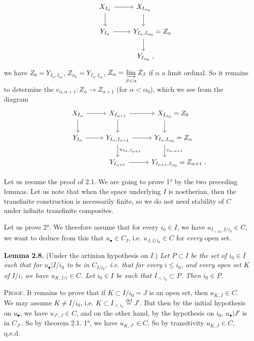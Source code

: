 
\[
\begin{tikzcd}
X_{I_\alpha} \arrow[r] \arrow[d] & X_{I_{\alpha_0}} \arrow[d] \\
Y_{I_\alpha} \arrow[r] & Y_{I_\alpha,I_{\alpha_0}} \rlap{${}= Z_\alpha$} \arrow[d] \\
& Y_{I_{\alpha_0}} \rlap{\ ,}
\end{tikzcd}
\]
we have $Z_0 = Y_{I_\alpha,I_{\alpha_0}}$, $Z_{\alpha_0} = Y_{I_\alpha,I_{\alpha_0}}$, $Z_\alpha = \varinjlim\limits_{\beta<\alpha} Z_\beta$ if $\alpha$  a limit ordinal. So it remains to determine the $v_{\alpha,\alpha+1} : Z_\alpha \longrightarrow Z_{\alpha+1}$ (for $\alpha < \alpha_0$), which we see from the diagram
\[
\begin{tikzcd}
X_{I_\alpha} \arrow[r] \arrow[d] & X_{I_{\alpha+1}} \arrow[r] \arrow[d] & X_{I_{\alpha_0}} \rlap{${}= Z_0$} \arrow[d] \\
Y_{I_\alpha} \arrow[r] & Y_{I_\alpha,I_{\alpha+1}} \arrow[r] \arrow[d, "u_{I_\alpha,I_{\alpha+1}}"] & Y_{I_\alpha,I_{\alpha_0}} \rlap{${}= Z_\alpha$} \arrow[d, "v_{\alpha,\alpha+1}"] \\
& Y_{I_{\alpha+1}} \arrow[r] & Y_{I_{\alpha+1},I_{\alpha_0}} \rlap{${}= Z_{\alpha+1}\ .$}
\end{tikzcd}
\]

Let us resume the proof of 2.1. We are going to prove 1° by the two preceding lemmas. Let us note that when the space underlying $I$ is noetherian, then the transfinite construction is necessarily finite, so we do not need stability of $C$ under infinite transfinite composites.


Let us prove 2°. We therefore assume that for every $i_0 \in I$, we have $u_{I_{<\alpha_0},I/i_0} \in C$, we want to deduce from this that $u_\bullet \in C_I$, i.e. $u_{J,I/i_0} \in C$ for \textit{every} open set.

\noindent\textbf{Lemma 2.8.} (Under the artinian hypothesis on $I$.) \textit{Let $P \subset I$ be the set of $i_0 \in I$ such that for $u_\bullet|I/i_0$ to be in $C_{I/i_0}$, i.e. that for every $i \leq i_0$, and every open set $K$ of $I/i$, we have $u_{K,I/i} \in C$. Let $i_0 \in I$ be such that $I_{<i_0} \subset P$. Then $i_0 \in P$.}

\noindent\textsc{Proof}. It remains to prove that if $K \subset I/i_0 = J$ is an open set, then $u_{K,J} \in C$. We may assume $K \neq I/i_0$, i.e. $K \subset I_{<i_0} \overset{\text{def}}{=} J'$. But then by the initial hypothesis on $u_\bullet$, we have $u_{J',J} \in C$, and on the other hand, by the hypothesis on $i_0$, $u_\bullet|J'$ is in $C_{J'}$. So by theorem 2.1. 1°, we have $u_{K,J'} \in C$. So by transitivity $u_{K,J} \in C$, q.e.d.

